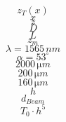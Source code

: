\documentclass[a4paper,12t,BCOR12mm,toc=bibliography]{article}
\begin{document}
\begingroup
\fontsize{18pt}{15pt}\selectfont
$$z_{\si{T}}(x)$$
$$x$$
$$z$$
$$D$$
$$L$$
$$z_{\si{m}}$$
$$\lambda=1565\,\si{nm}$$
$$\alpha=53^\circ$$
$$2000\,\si{\micro m}$$
$$200\,\si{\micro m}$$
$$160\,\si{\micro m}$$
$$h$$
$$d_{\si{Beam}}$$
$$T_0\cdot h^5$$
\endgroup
\end{document}
